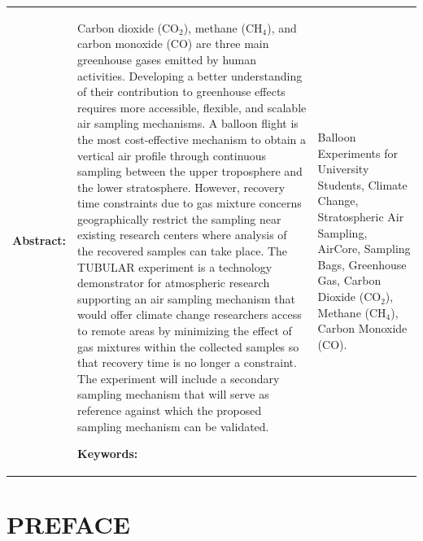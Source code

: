 \documentclass[a4paper,12pt,twoside]{article}
\providecommand{\DIFaddbegin}{} %
\providecommand{\DIFaddend}{} %
\providecommand{\DIFdelbegin}{} %
\providecommand{\DIFdelend}{} %
\newcommand{\DIFscaledelfig}{0.5}
\newlength{\DIFdelgraphicswidth} %
\newlength{\DIFdelgraphicsheight} %
\newcommand{\DIFaddincludegraphics}[2][]{{\color{blue}\fbox{\DIFOincludegraphics[#1]{#2}}}} %
\newcommand{\DIFdelincludegraphics}[2][]{%
\sbox{\DIFdelgraphicsbox}{\DIFOincludegraphics[#1]{#2}}%
\settoboxwidth{\DIFdelgraphicswidth}{\DIFdelgraphicsbox} %
\settoboxtotalheight{\DIFdelgraphicsheight}{\DIFdelgraphicsbox} %
\scalebox{\DIFscaledelfig}{%
\parbox[b]{\DIFdelgraphicswidth}{\usebox{\DIFdelgraphicsbox}\\[-\baselineskip] \rule{\DIFdelgraphicswidth}{0em}}\llap{\resizebox{\DIFdelgraphicswidth}{\DIFdelgraphicsheight}{%
\setlength{\unitlength}{\DIFdelgraphicswidth}%
\begin{picture}(1,1)%
\thicklines\linethickness{2pt} %
{\color[rgb]{1,0,0}\put(0,0){\framebox(1,1){}}}%
{\color[rgb]{1,0,0}\put(0,0){\line( 1,1){1}}}%
{\color[rgb]{1,0,0}\put(0,1){\line(1,-1){1}}}%
\end{picture}%
}\hspace*{3pt}}} %
} %
\DeclareRobustCommand{\DIFaddbegin}{\DIFOaddbegin \let\includegraphics\DIFaddincludegraphics} %
\DeclareRobustCommand{\DIFaddend}{\DIFOaddend \let\includegraphics\DIFOincludegraphics} %
\DeclareRobustCommand{\DIFdelbegin}{\DIFOdelbegin \let\includegraphics\DIFdelincludegraphics} %
\DeclareRobustCommand{\DIFdelend}{\DIFOaddend \let\includegraphics\DIFOincludegraphics} %
\begin{document}
\vspace{1cm}
\begin{tabular}{p{} p{}}
\textbf{Abstract:}     &  %
\DIFaddbegin 



\DIFaddend Carbon dioxide (CO$_{2}$), methane (CH$_{4}$), and carbon monoxide (CO) are three main greenhouse gases emitted by human activities. Developing a better understanding of their contribution to greenhouse effects requires more accessible, flexible, and scalable air sampling mechanisms. A balloon flight is the most cost-effective mechanism to obtain a vertical air profile through continuous sampling between the upper troposphere and the lower stratosphere. However, recovery time constraints due to gas mixture concerns geographically restrict the sampling near existing research centers where analysis of the recovered samples can take place. The TUBULAR experiment is a technology demonstrator for atmospheric research supporting an air sampling mechanism that would offer climate change researchers access to remote areas by minimizing the effect of gas mixtures within the collected samples so that recovery time is no longer a constraint. The experiment will include a secondary sampling mechanism that will serve as reference against which the proposed sampling mechanism can be validated.
\DIFdelbegin %
\DIFdelend \DIFaddbegin 

\DIFaddend \textbf{Keywords:}     & %
Balloon Experiments for University Students, Climate Change, Stratospheric Air Sampling, AirCore, Sampling Bags, Greenhouse Gas, Carbon Dioxide (CO$_{2}$), Methane (CH$_{4}$), Carbon Monoxide (CO).
\end{tabular}

\vfill

\newpage
\tableofcontents

\newpage
\section*{PREFACE} \markboth{}{}
\end{document}
